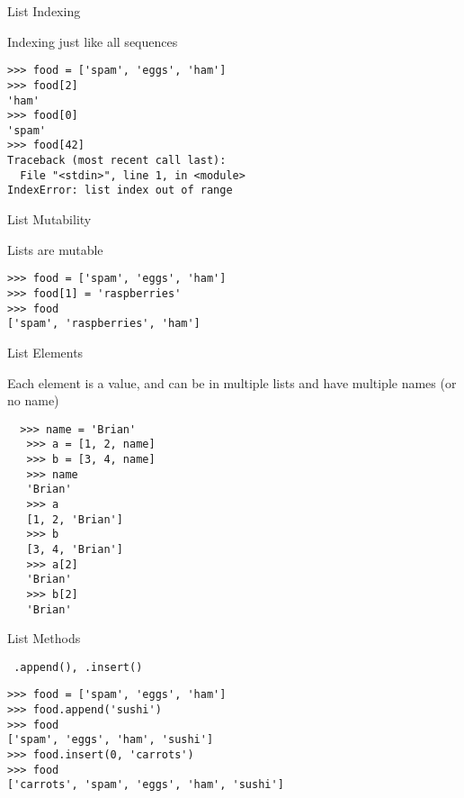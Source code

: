 \documentclass{beamer}
\begin{document}
\begin{frame}[fragile]{List Indexing}

 {\Large Indexing just like all sequences}

\begin{verbatim}
>>> food = ['spam', 'eggs', 'ham']
>>> food[2]
'ham'
>>> food[0]
'spam'
>>> food[42]
Traceback (most recent call last):
  File "<stdin>", line 1, in <module>
IndexError: list index out of range
\end{verbatim}

\end{frame} 

\begin{frame}[fragile]{List Mutability}

{\Large Lists are mutable}

\begin{verbatim}
>>> food = ['spam', 'eggs', 'ham']
>>> food[1] = 'raspberries'
>>> food
['spam', 'raspberries', 'ham']
\end{verbatim}

\end{frame} 

\begin{frame}[fragile]{List Elements}

{\Large Each element is a value, and can be in multiple lists and have multiple
names (or no name)}

\begin{verbatim}
  >>> name = 'Brian'
   >>> a = [1, 2, name]
   >>> b = [3, 4, name]
   >>> name
   'Brian'
   >>> a
   [1, 2, 'Brian']
   >>> b
   [3, 4, 'Brian']
   >>> a[2]
   'Brian'
   >>> b[2]
   'Brian'
\end{verbatim}

\end{frame} 

\begin{frame}[fragile]{List Methods}

{\Large \verb| .append(), .insert()|}

\begin{verbatim}
>>> food = ['spam', 'eggs', 'ham']
>>> food.append('sushi')
>>> food
['spam', 'eggs', 'ham', 'sushi']
>>> food.insert(0, 'carrots')
>>> food
['carrots', 'spam', 'eggs', 'ham', 'sushi']
\end{verbatim}

\end{frame} 
\end{document}
